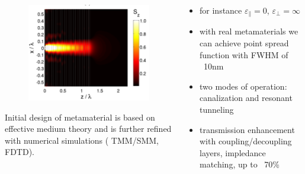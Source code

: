 \documentclass{beamer}
\begin{document}
\begin{frame}
	\begin{columns}
		\begin{column}{0.5\textwidth}
			\begin{figure}
				\includegraphics[width=\textwidth]{../images/multilayer/nondiffAMR.png}
			\end{figure}
		 	{\tiny Initial design of metamaterial is based on effective medium theory and is further refined with numerical simulations ( TMM/SMM, FDTD). }
		\end{column}
		 \begin{column}{0.5\textwidth}
			\begin{itemize}
				\item for instance $\varepsilon_{\parallel}=0$, $\varepsilon_{\perp}= \infty$ 
				\item with real metamaterials we can achieve point spread function with FWHM of ~10nm
				\item two modes of operation: canalization and resonant tunneling
				\item transmission enhancement with coupling/decoupling layers, impledance matching, up to ~70\%
			\end{itemize}
					
			
		\end{column}
	\end{columns}
\end{frame}
\end{document}
